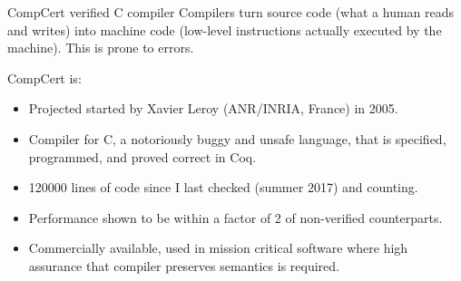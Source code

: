 \documentclass[10pt,handout]{beamer}
\theoremstyle{plain}
\theoremstyle{definition}
\begin{document}
\begin{frame}{CompCert verified C compiler}
    Compilers turn source code (what a human reads and writes) into machine code (low-level instructions actually executed by the machine).  This is prone to errors.
    \par\medskip\pause
    CompCert is:
    \begin{itemize}
        \item Projected started by Xavier Leroy (ANR/INRIA, France) in 2005.
        \item Compiler for C, a notoriously buggy and unsafe language, that is specified, programmed, and proved correct in Coq.\pause
        \item 120000 lines of code since I last checked (summer 2017) and counting.
        \item Performance shown to be within a factor of 2 of non-verified counterparts.\pause
        \item Commercially available, used in mission critical software where high assurance that compiler preserves semantics is required.
    \end{itemize}
\end{frame}
\end{document}
